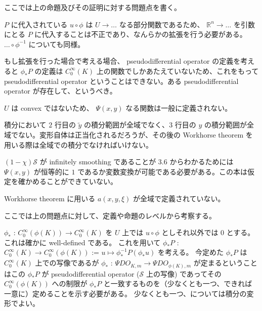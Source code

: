 \begin{Remark}
\item[] ここでは上の命題及びその証明に対する問題点を書く。
\item \(P\) に代入されている \(u \circ \phi\) は \(U \to \ldots\) なる部分関数であるため、 \(\mathbb{R}^n \to \ldots\) を引数にとる \(P\) に代入することは不正であり、なんらかの拡張を行う必要がある。 \(\ldots \circ \phi^{-1}\) についても同様。
\item もし拡張を行った場合で考える場合、 pseudodifferential operator の定義を考えると \(\phi_* P\) の定義は \(C^\infty_0(K)\) 上の関数でしかあたえていないため、これをもって pseudodifferential operator ということはできない。ある pseudodifferential operator が存在して、というべき。
\item \(U\) は convex ではないため、 \(\Psi(x,y)\) なる関数は一般に定義されない。
\item 積分において \(2\) 行目の \(\tilde{y}\) の積分範囲が全域でなく、\(3\) 行目の \(y\) の積分範囲が全域でない。変形自体は正当化されるだろうが、その後の Workhorse theorem を用いる際は全域での積分でなければいけない。
\item \((1 - \chi) \mathscr{S}\) が infinitely smoothing であることが 3.6 からわかるためには \(\Psi(x,y)\) が恒等的に \(1\) であるか変数変換が可能である必要がある。この本は仮定を確かめることができていない。
\item Workhorse theorem に用いる \(a(x,y,\xi)\) が全域で定義されていない。
\end{Remark}

ここでは上の問題点に対して、定義や命題のレベルから考察する。

\(\phi_*\) : \(C^\infty_0(\phi(K)) \to C^\infty_0(K)\) を \(U\) 上では \(u \circ \phi\) としそれ以外では \(0\) とする。
これは確かに well-defined である。
これを用いて \(\phi_* P\) : \(C^\infty_0(K) \to C^\infty_0(\phi(K))\) := \(u \mapsto \phi_*^{-1} P(\phi_* u)\) を考える。
今定めた \(\phi_* P\) は \(C^\infty_0(K)\) 上での写像であるが \(\phi_*\) : \(\Psi DO_{K,m} \to \Psi DO_{\phi(K),m}\) が定まるということはこの \(\phi_* P\) が pseudodifferential operator (\(\mathscr{S}\) 上の写像) であってその \(C^\infty_0(\phi(K))\) への制限が \(\phi_* P\) と一致するものを（少なくとも一つ、できれば一意に）定めることを示す必要がある。
少なくとも一つ、については積分の変形でよい。

